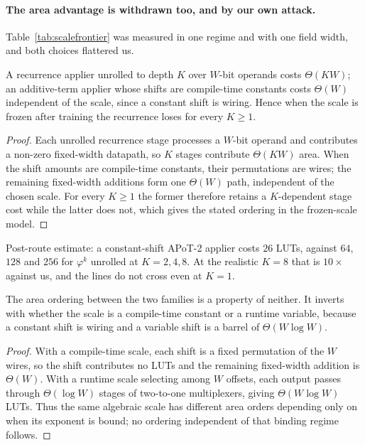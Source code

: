\paragraph{The area advantage is withdrawn too, and by our own attack.}
Table~\ref{tab:scalefrontier} was measured in one regime and with one field
width, and both choices flattered us.

\begin{theorem}
\label{thm:unrolled}
A recurrence applier unrolled to depth $K$ over $W$-bit operands costs
$\Theta(KW)$; an additive-term applier whose shifts are compile-time constants
costs $\Theta(W)$ independent of the scale, since a constant shift is wiring.
Hence when the scale is frozen after training the recurrence loses for every
$K \ge 1$.
\end{theorem}
\begin{proof}
Each unrolled recurrence stage processes a $W$-bit operand and contributes a
non-zero fixed-width datapath, so $K$ stages contribute $\Theta(KW)$ area.
When the shift amounts are compile-time constants, their permutations are wires;
the remaining fixed-width additions form one $\Theta(W)$ path, independent of
the chosen scale.  For every $K\geq1$ the former therefore retains a
$K$-dependent stage cost while the latter does not, which gives the stated
ordering in the frozen-scale model.
\end{proof}

Post-route estimate: a constant-shift APoT-2 applier costs $26$ LUTs, against $64$, $128$
and $256$ for $\varphi^{k}$ unrolled at $K=2,4,8$. At the realistic $K=8$ that is
$10\times$ against us, and the lines do not cross even at $K=1$.

\begin{theorem}
\label{thm:regime}
The area ordering between the two families is a property of neither. It inverts
with whether the scale is a compile-time constant or a runtime variable, because
a constant shift is wiring and a variable shift is a barrel of
$\Theta(W\log W)$.
\end{theorem}
\begin{proof}
With a compile-time scale, each shift is a fixed permutation of the $W$ wires,
so the shift contributes no LUTs and the remaining fixed-width addition is
$\Theta(W)$.  With a runtime scale selecting among $W$ offsets, each output
passes through $\Theta(\log W)$ stages of two-to-one multiplexers, giving
$\Theta(W\log W)$ LUTs.  Thus the same algebraic scale has different area
orders depending only on when its exponent is bound; no ordering independent
of that binding regime follows.
\end{proof}


